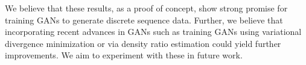 We believe that these results, as a proof of concept, show strong promise for training GANs to generate discrete sequence data. Further, we believe that incorporating recent advances in GANs such as training GANs using variational divergence minimization \cite{nowozin2016f} or via density ratio estimation \cite{uehara2016generative} could yield further improvements. We aim to experiment with these in future work.
